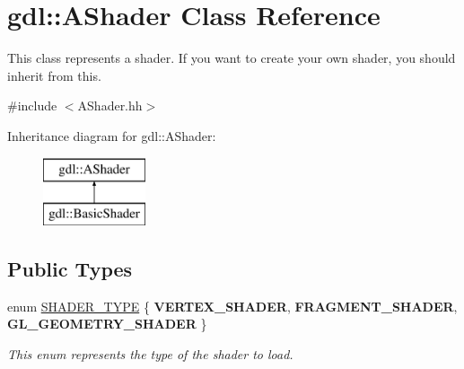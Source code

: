 \hypertarget{classgdl_1_1_a_shader}{\section{gdl\-:\-:A\-Shader Class Reference}
\label{classgdl_1_1_a_shader}
}


This class represents a shader. If you want to create your own shader, you should inherit from this.  




{\ttfamily \#include $<$A\-Shader.\-hh$>$}

Inheritance diagram for gdl\-:\-:A\-Shader\-:\begin{figure}[H]
\begin{center}
\leavevmode
\includegraphics[height=2.000000cm]{classgdl_1_1_a_shader}
\end{center}
\end{figure}
\subsection*{Public Types}
\begin{DoxyCompactItemize}
\item 
enum \hyperlink{classgdl_1_1_a_shader_a21924b9a44218cc65044f4edb385c9e9}{S\-H\-A\-D\-E\-R\-\_\-\-T\-Y\-P\-E} \{ {\bfseries V\-E\-R\-T\-E\-X\-\_\-\-S\-H\-A\-D\-E\-R}, 
{\bfseries F\-R\-A\-G\-M\-E\-N\-T\-\_\-\-S\-H\-A\-D\-E\-R}, 
{\bfseries G\-L\-\_\-\-G\-E\-O\-M\-E\-T\-R\-Y\-\_\-\-S\-H\-A\-D\-E\-R}
 \}
\begin{DoxyCompactList}\small\item\em This enum represents the type of the shader to load. \end{DoxyCompactList}\end{DoxyCompactItemize}
